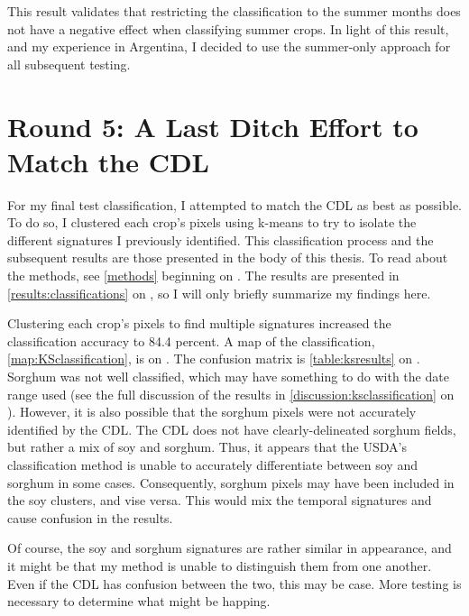 This result validates that restricting the classification to the summer months does not have a negative effect when classifying summer crops. In light of this result, and my experience in Argentina, I decided to use the summer-only approach for all subsequent testing.


\section{Round 5: A Last Ditch Effort to Match the CDL}

For my final test classification, I attempted to match the CDL as best as possible. To do so, I clustered each crop's pixels using k-means to try to isolate the different signatures I previously identified. This classification process and the subsequent results are those presented in the body of this thesis. To read about the methods, see \cref{methods} beginning on . The results are presented in \autoref{results:classifications} on , so I will only briefly summarize my findings here. 

Clustering each crop's pixels to find multiple signatures increased the classification accuracy to 84.4 percent. A map of the classification, \cref{map:KSclassification}, is on . The confusion matrix is \cref{table:ksresults} on . Sorghum was not well classified, which may have something to do with the date range used (see the full discussion of the results in \autoref{discussion:ksclassification} on ). However, it is also possible that the sorghum pixels were not accurately identified by the CDL. The CDL does not have clearly-delineated sorghum fields, but rather a mix of soy and sorghum. Thus, it appears that the USDA’s classification method is unable to accurately differentiate between soy and sorghum in some cases. Consequently, sorghum pixels may have been included in the soy clusters, and vise versa. This would mix the temporal signatures and cause confusion in the results. 

Of course, the soy and sorghum signatures are rather similar in appearance, and it might be that my method is unable to distinguish them from one another. Even if the CDL has confusion between the two, this may be case. More testing is necessary to determine what might be happing.


